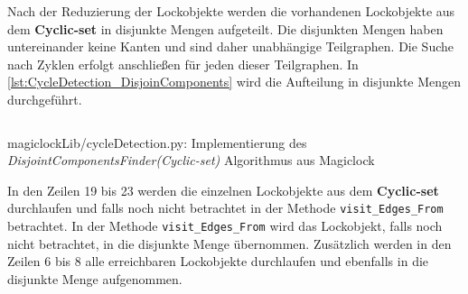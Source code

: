 Nach der Reduzierung der Lockobjekte werden die vorhandenen Lockobjekte aus dem
\textbf{Cyclic-set} in disjunkte Mengen aufgeteilt. Die disjunkten Mengen haben
untereinander keine Kanten und sind daher unabhängige Teilgraphen. Die Suche
nach Zyklen erfolgt anschließen für jeden dieser Teilgraphen. In
\cref{lst:CycleDetection_DisjoinComponents} wird die Aufteilung in disjunkte
Mengen durchgeführt. 
\begin{listing}[ht]
  \inputminted[frame=lines,linenos,firstline=1,lastline=25]{python}{./Python/magiclockLib/cycleDetection.py}
  \caption{magiclockLib/cycleDetection.py: Implementierung des \textit{DisjointComponentsFinder(Cyclic-set)} Algorithmus aus Magiclock\autocite[8]{MagicLock}}
  \label{lst:CycleDetection_DisjoinComponents}
\end{listing}
In den Zeilen 19 bis 23 werden die einzelnen Lockobjekte aus dem
\textbf{Cyclic-set} durchlaufen und falls noch nicht betrachtet in der Methode
\texttt{visit\_Edges\_From} betrachtet. In der Methode \texttt{visit\_Edges\_From}
wird das Lockobjekt, falls noch nicht betrachtet, in die disjunkte Menge
übernommen. Zusätzlich werden in den Zeilen 6 bis 8 alle erreichbaren
Lockobjekte durchlaufen und ebenfalls in die disjunkte Menge aufgenommen.

